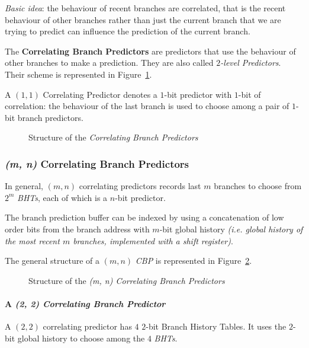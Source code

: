 \documentclass[english]{article}
\begin{document}
\textit{Basic idea}: the behaviour of recent branches are correlated, that is the recent behaviour of other branches rather than just the current branch that we are trying to predict can influence the prediction of the current branch.

The \textbf{Correlating Branch Predictors} are predictors that use the behaviour of other branches to make a prediction.
They are also called \textit{\(2\)-level Predictors}.
Their scheme is represented in Figure~\ref{fig:structure-of-CBP}.

A \((1, 1)\) Correlating Predictor denotes a \(1\)-bit predictor with \(1\)-bit of correlation: the behaviour of the last branch is used to choose among a pair of \(1\)-bit branch predictors.

\begin{figure}[htbp]
  \bigskip
  \centering
  \caption{Structure of the \textit{Correlating Branch Predictors}}
  \label{fig:structure-of-CBP}
  \bigskip
\end{figure}

\subsubsection{\textit{(m, n)} Correlating Branch Predictors}

In general, \((m, n)\) correlating predictors records last \(m\) branches to choose from \(2^m\) \textit{BHTs}, each of which is a \(n\)-bit predictor.

The branch prediction buffer can be indexed by using a concatenation of low order bits from the branch address with \(m\)-bit global history \textit{(i.e. global history of the most recent \(m\) branches, implemented with a shift register)}.

The general structure of a \((m, n)\) \textit{CBP} is represented in Figure~\ref{fig:m-n-CBP}.

\begin{figure}[htbp]
  \bigskip
  \centering
  \caption{Structure of the \textit{(m, n) Correlating Branch Predictors}}
  \label{fig:m-n-CBP}
  \bigskip
\end{figure}

\paragraph{A \textit{(2, 2) Correlating Branch Predictor}}

A \((2, 2)\) correlating predictor has \(4\) \(2\)-bit Branch History Tables.
It uses the \(2\)-bit global history to choose among the \(4\) \textit{BHTs}.
\end{document}
